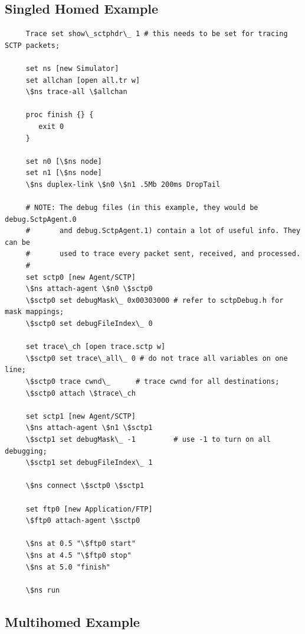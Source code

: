      \subsection{Singled Homed Example}

	 \begin{verbatim}
	 Trace set show\_sctphdr\_ 1 # this needs to be set for tracing SCTP packets;

	 set ns [new Simulator]
	 set allchan [open all.tr w]
	 \$ns trace-all \$allchan

	 proc finish {} {
	    exit 0
	 }

	 set n0 [\$ns node]
	 set n1 [\$ns node]
	 \$ns duplex-link \$n0 \$n1 .5Mb 200ms DropTail

	 # NOTE: The debug files (in this example, they would be debug.SctpAgent.0
	 #       and debug.SctpAgent.1) contain a lot of useful info. They can be 
	 #       used to trace every packet sent, received, and processed.
	 #
	 set sctp0 [new Agent/SCTP]
	 \$ns attach-agent \$n0 \$sctp0
	 \$sctp0 set debugMask\_ 0x00303000 # refer to sctpDebug.h for mask mappings;
	 \$sctp0 set debugFileIndex\_ 0

	 set trace\_ch [open trace.sctp w]
	 \$sctp0 set trace\_all\_ 0 # do not trace all variables on one line;
	 \$sctp0 trace cwnd\_      # trace cwnd for all destinations;
	 \$sctp0 attach \$trace\_ch

	 set sctp1 [new Agent/SCTP]
	 \$ns attach-agent \$n1 \$sctp1
	 \$sctp1 set debugMask\_ -1         # use -1 to turn on all debugging;
	 \$sctp1 set debugFileIndex\_ 1

	 \$ns connect \$sctp0 \$sctp1

	 set ftp0 [new Application/FTP]
	 \$ftp0 attach-agent \$sctp0

	 \$ns at 0.5 "\$ftp0 start"
	 \$ns at 4.5 "\$ftp0 stop"
	 \$ns at 5.0 "finish"

	 \$ns run
	 \end{verbatim}


      \subsection{Multihomed Example}
      \label{sec:multihomedExample}

